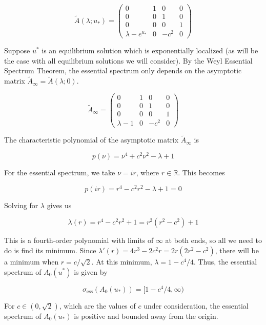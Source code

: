 \documentclass[12pt]{article}
\def\R{{\mathbb R}}
\begin{document}
\begin{equation}\label{A0system}
\tilde{A}(\lambda; u_*) = \begin{pmatrix}
0 & 1 & 0 & 0 \\
0 & 0 & 1 & 0 \\
0 & 0 & 0 & 1 \\
\lambda - e^{u_*} & 0 & -c^2 & 0 
\end{pmatrix}
\end{equation}

Suppose $u^*$ is an equilibrium solution which is exponentially localized (as will be the case with all equilibrium solutions we will consider). By the Weyl Essential Spectrum Theorem, the essential spectrum only depends on the asymptotic matrix $\tilde{A}_\infty = \tilde{A}(\lambda; 0)$.

\begin{equation}
\tilde{A}_\infty = \begin{pmatrix}
0 & 1 & 0 & 0 \\
0 & 0 & 1 & 0 \\
0 & 0 & 0 & 1 \\
\lambda - 1 & 0 & -c^2 & 0 
\end{pmatrix}
\end{equation}

The characteristic polynomial of the asymptotic matrix $\tilde{A}_\infty$ is 

\[
p(\nu) = \nu^4 + c^2 \nu^2 - \lambda + 1
\]

For the essential spectrum, we take $\nu = i r$, where $r \in \R$. This becomes

\[
p(i r) = r^4 - c^2 r^2 - \lambda + 1 = 0
\]

Solving for $\lambda$ gives us

\[
\lambda(r) = r^4 - c^2 r^2 + 1 = r^2(r^2 - c^2) + 1
\]

This is a fourth-order polynomial with limits of $\infty$ at both ends, so all we need to do is find its minimum. Since $\lambda'(r) = 4 r^3 - 2 c^2 r = 2 r(2 r^2 - c^2)$, there will be a minimum when $r = c/\sqrt{2}$. At this minimum, $\lambda = 1 - c^4/4$. Thus, the essential spectrum of $A_0(u^*)$ is given by

\begin{equation}\label{A0ess}
\sigma_{\text{ess}}(A_0(u_*)) = [1 - c^4/4, \infty)
\end{equation}

For $c \in (0, \sqrt{2})$, which are the values of $c$ under consideration, the essential spectrum of $A_0(u_*)$ is positive and bounded away from the origin.\\
\end{document}
